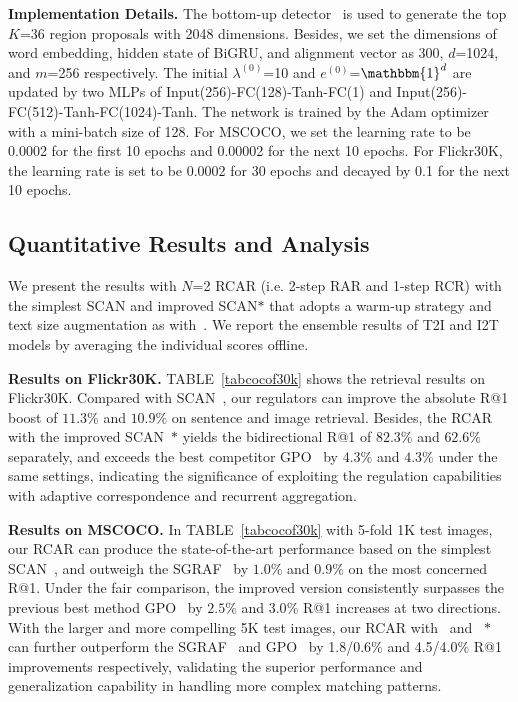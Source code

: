 \documentclass[journal]{IEEEtran}\newcommand{\ignore}[1]{}
\begin{document}
\textbf{Implementation Details.}
The bottom-up detector~\cite{BU_TDA} is used to generate the top $K$=36 region proposals with 2048 dimensions. Besides, we set the dimensions of word embedding, hidden state of BiGRU, and alignment vector as 300, $d$=1024, and $m$=256 respectively. The initial $\lambda^{(0)}$=10 and $e^{(0)}$=$\mathbbm{1}^{d}$ are updated by two MLPs of Input(256)-FC(128)-Tanh-FC(1) and Input(256)-FC(512)-Tanh-FC(1024)-Tanh.
The network is trained by the Adam optimizer~\cite{Adam} with a mini-batch size of 128. For MSCOCO, we set the learning rate to be 0.0002 for the first 10 epochs and 0.00002 for the next 10 epochs. For Flickr30K, the learning rate is set to be 0.0002 for 30 epochs and decayed by 0.1 for the next 10 epochs. 

\subsection{Quantitative Results and Analysis}
We present the results with $N$=2 RCAR (i.e. 2-step RAR and 1-step RCR) with the simplest SCAN and improved SCAN$\ast$ that adopts a warm-up strategy and text size augmentation as with~\cite{GPO}. We report the ensemble results of T2I and I2T models by averaging the individual scores offline.

\textbf{Results on Flickr30K.} 
TABLE~\ref{tabcocof30k} shows the retrieval results on Flickr30K. Compared with SCAN~\cite{SCAN}, our regulators can improve the absolute R@1 boost of $11.3\%$ and $10.9\%$ on sentence and image retrieval. Besides, the RCAR with the improved SCAN~\cite{SCAN}$\ast$ yields the bidirectional R@1 of $82.3\%$ and $62.6\%$ separately, and exceeds the best competitor GPO~\cite{GPO} by $4.3\%$ and $4.3\%$ under the same settings, indicating the significance of exploiting the regulation capabilities with adaptive correspondence and recurrent aggregation.

\textbf{Results on MSCOCO.} 
In TABLE~\ref{tabcocof30k} with 5-fold 1K test images, our RCAR can produce the state-of-the-art performance based on the simplest SCAN~\cite{SCAN}, and outweigh the SGRAF~\cite{SGRAF} by $1.0\%$ and $0.9\%$ on the most concerned R@1. Under the fair comparison, the improved version consistently surpasses the previous best method GPO~\cite{GPO} by $2.5\%$ and $3.0\%$ R@1 increases at two directions.
With the larger and more compelling 5K test images, our RCAR with~\cite{SCAN} and ~\cite{SCAN}$\ast$ can further outperform the SGRAF~\cite{SGRAF} and GPO~\cite{GPO} by 1.8/0.6$\%$ and 4.5/4.0$\%$ R@1 improvements respectively, validating the superior performance and generalization capability in handling more complex matching patterns. 
\end{document}
